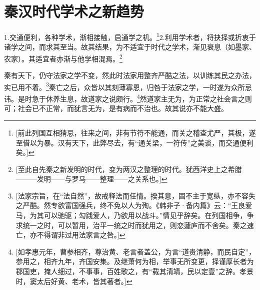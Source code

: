 \chapter{秦汉时代学术之新趋势}

1.交通便利，各种学术，渐相接触，启通学之机。\footnote{[前此列国互相猜忌，往来之间，非有节符不能通，而关之稽查尤严，其极，遂至借以为暴。汉有天下，此弊尽去，有“通关梁，一符传”之美谈，而交通便利矣。]}2.利用学术者，将抉择或折衷于诸学之间，而求其至当。故其结果，为不适宜于时代之学术，渐见衰息（如墨家、农家）。其适宜者亦渐与他学相混焉。\footnote{[至此自先秦之新发明的时代，变为两汉之整理的时代。犹西洋史上之希腊———发明——与罗马——整理——之关系也。]}

秦有天下，仍守法家之学不变，然此时法家用整齐严酷之法，以训练其民之办法，实已用不着。\footnote{[法家宗旨，在“法自然”，故戒释法而任情。揆其意，固不主于宽纵，亦不容失之严酷。然专欲富国强兵，终不免以人为殉。《韩非子·备内篇》云：“王良爱马，为其可以驰驱；勾践爱人，乃欲用以战斗。”情见乎辞矣。在列国相争，争求统一之时，可以暂用，治平一统之时而犹用之，则恋蘧庐而不舍矣。秦之速亡，亦不得谓非过用法家言之咎。]}秦亡之后，众皆以其刻薄寡恩，归咎于法家之学，一时遂为众所忌讳。是时急于休养生息，故道家之说颇行。\footnote{[如孝惠元年，曹参相齐，尊治黄、老言者盖公，为言“道贵清静，而民自定”，参用之，相齐九年，齐国安集。及继萧何为相，举事无所变更，择谨厚长者为郡国吏，掩人细过，不事事，百姓歌之，有“载其清靖，民以定壹”之辞。孝景时，窦太后好黄、老术，皆其著者。]}然道家主无为，为正常之社会言之则可；社会已不正常，而犹言无为，是有病而不治也。故其说亦不能大盛。
